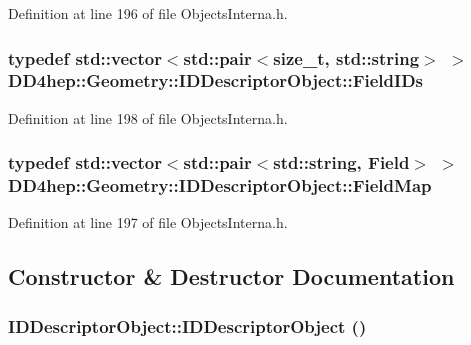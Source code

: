 Definition at line 196 of file ObjectsInterna.h.\hypertarget{class_d_d4hep_1_1_geometry_1_1_i_d_descriptor_object_aa9d779170fd1d2221d27f3b63df6d6d4}{
\subsubsection[{FieldIDs}]{\setlength{\rightskip}{0pt plus 5cm}typedef std::vector$<$std::pair$<$size\_\-t, std::string$>$ $>$ {\bf DD4hep::Geometry::IDDescriptorObject::FieldIDs}}}
\label{class_d_d4hep_1_1_geometry_1_1_i_d_descriptor_object_aa9d779170fd1d2221d27f3b63df6d6d4}


Definition at line 198 of file ObjectsInterna.h.\hypertarget{class_d_d4hep_1_1_geometry_1_1_i_d_descriptor_object_a784af03aa08575a914c2399b45eae052}{
\subsubsection[{FieldMap}]{\setlength{\rightskip}{0pt plus 5cm}typedef std::vector$<$std::pair$<$std::string, {\bf Field}$>$ $>$ {\bf DD4hep::Geometry::IDDescriptorObject::FieldMap}}}
\label{class_d_d4hep_1_1_geometry_1_1_i_d_descriptor_object_a784af03aa08575a914c2399b45eae052}


Definition at line 197 of file ObjectsInterna.h.

\subsection{Constructor \& Destructor Documentation}
\hypertarget{class_d_d4hep_1_1_geometry_1_1_i_d_descriptor_object_a42a00825ff023bcce96505e616599e94}{
\subsubsection[{IDDescriptorObject}]{\setlength{\rightskip}{0pt plus 5cm}IDDescriptorObject::IDDescriptorObject ()}}
\label{class_d_d4hep_1_1_geometry_1_1_i_d_descriptor_object_a42a00825ff023bcce96505e616599e94}


